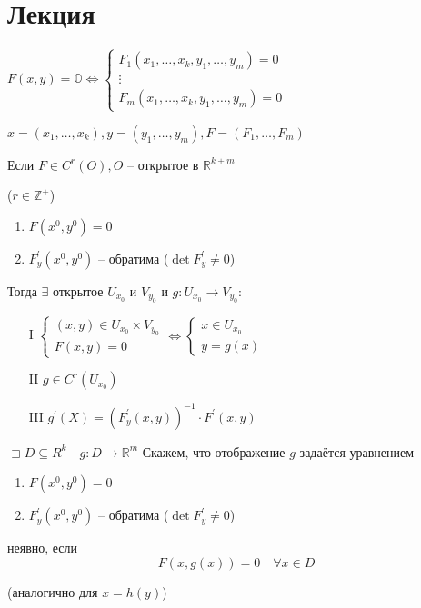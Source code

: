 \documentclass{book}
\newcommand\R{\ensuremath{\mathbb{R}}}
\newcommand\Z{\ensuremath{\mathbb{Z}}}
\newcommand{\p}[1]{#1^{\prime}}
\theoremstyle{definition}
\begin{document}
\section{Лекция}

\begin{theorem}

    $F(x, y) = \mathbb O \iff  \begin{cases}
        F_1\left( x_1, \ldots, x_k, y_1, \ldots, y_m \right)  = 0\\
        \vdots\\
        F_m\left( x_1, \ldots, x_k, y_1, \ldots, y_m \right) = 0
    \end{cases}$ 

    $x = \left( x_1, \ldots, x_k \right) , y = \left( y_1, \ldots, y_m \right) , F = \left( F_1, \ldots, F_m \right) $

    Если $F\in C^r(O), O$ -- открытое в  $\R^{k+m}$

    ($r\in \Z ^+$)
    \begin{enumerate}
        \item $F(x^0, y^0) = 0$
        \item $\p F_y(x^0, y^0)$ -- обратима ($\det \p F_y\neq 0$)
    \end{enumerate}

    Тогда $\exists $ открытое $U_{x_0}$ и $V_{y_0}$ и $g:U_{x_0}\to V_{y_0}$:
    \begin{enumerate}
        \item [I] $ \begin{cases}
                (x,y)\in U_{x_0}\times V_{y_0}\\
                F(x,y) = 0
        \end{cases} \iff \begin{cases}
        x\in U_{x_0}\\
        y = g(x)
        \end{cases}$ 
    \item [II] $g\in C^r(U_{x_0})$
    \item [III] $\p g(X) = \left( \p F_y(x,y) \right) ^{-1}\cdot \p F(x,y)$
    \end{enumerate}
\end{theorem}

\begin{definition}

    $\sqsupset D\subseteq R^k\quad g: D\to \R^m$ Скажем, что отображение $g$ задаётся уравнением 
    \begin{enumerate}
        \item $F(x^0, y^0) = 0$
        \item $\p F_y(x^0, y^0)$ -- обратима ($\det \p F_y\neq 0$)
    \end{enumerate}
    неявно, если \[F(x,g(x)) = 0 \quad \forall x\in D\]

    (аналогично для $x = h(y)$)
\end{definition}
\end{document}
